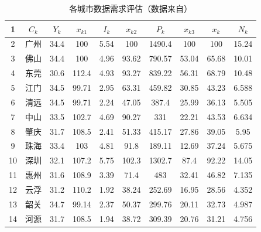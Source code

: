 \documentclass[UTF8,12pt]{ctexart}
\begin{document}
            \begin{table}[H]
                \centering
                \caption{各城市数据需求评估（数据来自\cite{CSSJ}）}\label{PF}
                  \begin{tabular}{cccccccccc}
                  \toprule
                  1      & $C_k$ & $Y_k$ & $x_{k1}$ & $I_k$ & $x_{k2}$ & $P_k$ & $x_{k3}$ & $x_k$ & $N_k$ \\
                  \midrule
                  2      & 广州     & 34.4   & 100    & 5.54   & 100    & 1490.4 & 100    & 100    & 15.24 \\
                  \midrule
                  3      & 佛山     & 34.4   & 100    & 4.96   & 93.62  & 790.57 & 53.04  & 65.68  & 10.01 \\
                  \midrule
                  4      & 东莞     & 30.6   & 112.4  & 4.93   & 93.27  & 839.22 & 56.31  & 68.79  & 10.48 \\
                  \midrule
                  5      & 江门     & 34.5   & 99.71  & 2.95   & 63.31  & 459.82 & 30.85  & 43.23  & 6.588 \\
                  \midrule
                  6      & 清远     & 34.5   & 99.71  & 2.24   & 47.05  & 387.4  & 25.99  & 36.13  & 5.505 \\
                  \midrule
                  7      & 中山     & 33.5   & 102.7  & 4.69   & 90.27  & 331    & 22.21  & 43.53  & 6.634 \\
                  \midrule
                  8      & 肇庆     & 31.7   & 108.5  & 2.41   & 51.33  & 415.17 & 27.86  & 39.05  & 5.95 \\
                  \midrule
                  9      & 珠海     & 33.4   & 103    & 4.81   & 91.8   & 189.11 & 12.69  & 37.24  & 5.675 \\
                  \midrule
                  10     & 深圳     & 32.1   & 107.2  & 5.75   & 102.3  & 1302.7 & 87.4   & 92.22  & 14.05 \\
                  \midrule
                  11     & 惠州     & 31.6   & 108.9  & 3.39   & 71.4   & 483    & 32.41  & 46.82  & 7.135 \\
                  \midrule
                  12     & 云浮     & 31.2   & 110.2  & 1.92   & 38.24  & 252.69 & 16.95  & 28.56  & 4.352 \\
                  \midrule
                  13     & 韶关     & 34.7   & 99.14  & 2.37   & 50.37  & 299.76 & 20.11  & 32.73  & 4.987 \\
                  \midrule
                  14     & 河源     & 31.7   & 108.5  & 1.94   & 38.72  & 309.39 & 20.76  & 31.21  & 4.756 \\

\end{tabular}
\end{table}
\end{document}
